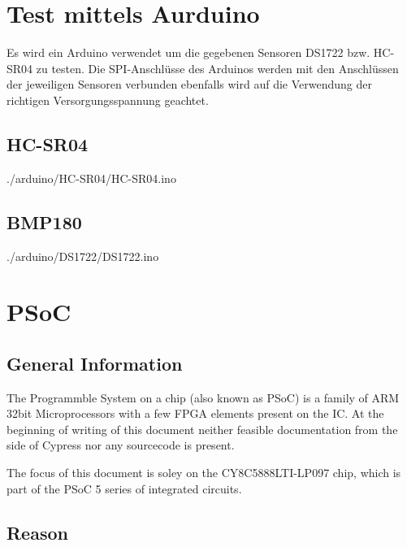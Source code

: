 \documentclass[12pt,a4paper]{article}
\def\psocdisasm{0}
\begin{document}
\section{Test mittels Aurduino}

Es wird ein Arduino verwendet um die gegebenen Sensoren DS1722 bzw. HC-SR04 zu 
testen. Die SPI-Anschlüsse des Arduinos werden mit den Anschlüssen der
jeweiligen Sensoren verbunden ebenfalls wird auf die Verwendung der richtigen Versorgungsspannung geachtet.

\newpage
\subsection{HC-SR04}


 {./arduino/HC-SR04/HC-SR04.ino}

\newpage
\subsection{BMP180}


 {./arduino/DS1722/DS1722.ino}

\if\psocdisasm

\section{PSoC}

\subsection{General Information}

The Programmble System on a chip (also known as PSoC) is a family of ARM 32bit
Microprocessors with a few FPGA elements present on the IC. At the beginning of
writing of this document neither feasible documentation from the side of Cypress
nor any sourcecode is present.

The focus of this document is soley on the CY8C5888LTI-LP097 chip, which is part
of the PSoC 5 series of integrated circuits.

\subsection{Reason}
\end{document}
